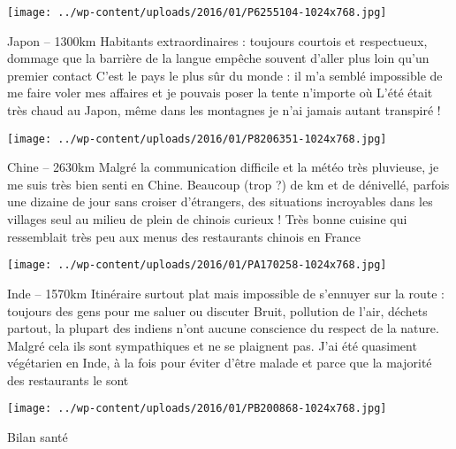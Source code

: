  \newline
\centerline{\texttt{[image: ../wp-content/uploads/2016/01/P6255104-1024x768.jpg]} } 
 \newline
 Japon – 1300km \newline
 Habitants extraordinaires : toujours courtois et respectueux, dommage que la barrière de la langue empêche souvent d'aller plus loin qu'un premier contact \newline
 C'est le pays le plus sûr du monde : il m'a semblé impossible de me faire voler mes affaires et je pouvais poser la tente n'importe où \newline
 L'été était très chaud au Japon, même dans les montagnes je n'ai jamais autant transpiré ! \newline
 \newline
\centerline{\texttt{[image: ../wp-content/uploads/2016/01/P8206351-1024x768.jpg]} } 
 \newline
 Chine – 2630km \newline
 Malgré la communication difficile et la météo très pluvieuse, je me suis très bien senti en Chine. Beaucoup (trop ?) de km et de dénivellé, parfois une dizaine de jour sans croiser d'étrangers, des situations incroyables dans les villages seul au milieu de plein de chinois curieux ! \newline
 Très bonne cuisine qui ressemblait très peu aux menus des restaurants chinois en France \newline
 \newline
\centerline{\texttt{[image: ../wp-content/uploads/2016/01/PA170258-1024x768.jpg]} } 
 \newline
 Inde – 1570km \newline
 Itinéraire surtout plat mais impossible de s'ennuyer sur la route : toujours des gens pour me saluer ou discuter \newline
 Bruit, pollution de l'air, déchets partout, la plupart des indiens n'ont aucune conscience du respect de la nature. Malgré cela ils sont sympathiques et ne se plaignent pas. \newline
 J'ai été quasiment végétarien en Inde, à la fois pour éviter d'être malade et parce que la majorité des restaurants le sont \newline
 \newline
\centerline{\texttt{[image: ../wp-content/uploads/2016/01/PB200868-1024x768.jpg]} } 
 \newline
 Bilan santé \newline
